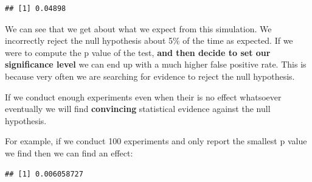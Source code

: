 \documentclass[
]{book}
\newenvironment{Shaded}{\begin{snugshade}}{\end{snugshade}}
\newcommand{\AttributeTok}[1]{\textcolor[rgb]{0.77,0.63,0.00}{#1}}
\newcommand{\DecValTok}[1]{\textcolor[rgb]{0.00,0.00,0.81}{#1}}
\newcommand{\FloatTok}[1]{\textcolor[rgb]{0.00,0.00,0.81}{#1}}
\newcommand{\FunctionTok}[1]{\textcolor[rgb]{0.00,0.00,0.00}{#1}}
\newcommand{\NormalTok}[1]{#1}
\newcommand{\OtherTok}[1]{\textcolor[rgb]{0.56,0.35,0.01}{#1}}
\newcommand{\SpecialCharTok}[1]{\textcolor[rgb]{0.00,0.00,0.00}{#1}}
\newcommand{\StringTok}[1]{\textcolor[rgb]{0.31,0.60,0.02}{#1}}
\theoremstyle{definition}
\theoremstyle{definition}
\theoremstyle{definition}
\theoremstyle{definition}
\theoremstyle{remark}
\begin{document}
\begin{Shaded}
\end{Shaded}

\begin{verbatim}
## [1] 0.04898
\end{verbatim}

We can see that we get about what we expect from this simulation. We incorrectly reject the null hypothesis about 5\% of the time as expected. If we were to compute the p value of the test, \textbf{and then decide to set our significance level} we can end up with a much higher false positive rate. This is because very often we are searching for evidence to reject the null hypothesis.

If we conduct enough experiments even when their is no effect whatsoever eventually we will find \textbf{convincing} statistical evidence against the null hypothesis.

For example, if we conduct 100 experiments and only report the smallest p value we find then we can find an effect:

\begin{Shaded}
\end{Shaded}

\begin{verbatim}
## [1] 0.006058727
\end{verbatim}
\end{document}
